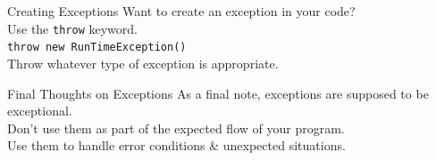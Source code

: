 \documentclass[aspectratio=169]{beamer}
\begin{document}
\begin{frame}{Creating Exceptions}
\Large
Want to create an exception in your code?  \\
\vspace{0.5em}
Use the \texttt{throw} keyword.  \\
\vspace{0.5em}
\texttt{throw new RunTimeException()} \\
\vspace{0.5em}
Throw whatever type of exception is appropriate. \\
\end{frame}



\begin{frame}{Final Thoughts on Exceptions}
\Large
As a final note, exceptions are supposed to be exceptional. \\
\vspace{1em}
Don't use them as part of the expected flow of your program. \\
\vspace{1em}
Use them to handle error conditions \& unexpected situations. \\
\end{frame}
\end{document}
